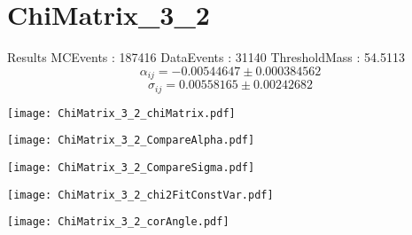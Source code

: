\documentclass[a4paper,12pt]{article}
\begin{document}
\section{ChiMatrix\_3\_2}
\begin{minipage}{0.49\linewidth} Results \newline
MCEvents : 187416\newline
DataEvents : 31140 \newline
ThresholdMass : 54.5113\\
$$\alpha_{ij} = -0.00544647\pm 0.000384562$$
$$\sigma_{ij} = 0.00558165\pm 0.00242682$$
\end{minipage}\hfill
\begin{minipage}{0.49\linewidth} 
\texttt{[image: ChiMatrix\_3\_2\_chiMatrix.pdf]}\\
\end{minipage}
\hfill
\begin{minipage}{0.49\linewidth} 
\texttt{[image: ChiMatrix\_3\_2\_CompareAlpha.pdf]}\\
\end{minipage}
\hfill
\begin{minipage}{0.49\linewidth} 
\texttt{[image: ChiMatrix\_3\_2\_CompareSigma.pdf]}\\
\end{minipage}
\begin{minipage}{0.49\linewidth} 
\texttt{[image: ChiMatrix\_3\_2\_chi2FitConstVar.pdf]}\\
\end{minipage}
\hfill
\begin{minipage}{0.49\linewidth} 
\texttt{[image: ChiMatrix\_3\_2\_corAngle.pdf]}\\
\end{minipage}
\end{document}
